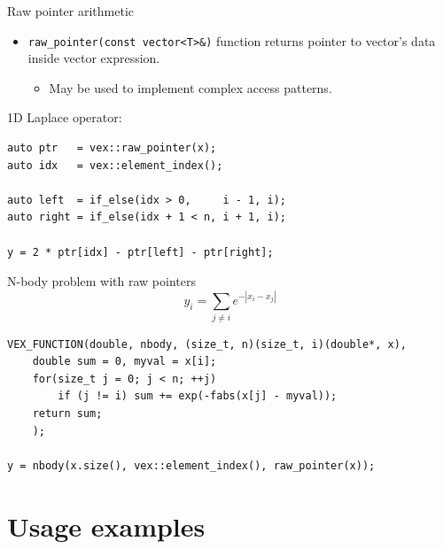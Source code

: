 \documentclass[@BEAMER_OPTIONS@]{beamer}
\newcommand{\code}[1]{\lstinline|#1|}
\begin{document}
\begin{frame}[fragile]{Raw pointer arithmetic}
    \begin{itemize}
        \item \code{raw_pointer(const vector<T>&)} function returns pointer to
            vector's data\\ inside vector expression.
            \begin{itemize}
                \item May be used to implement complex access patterns.
            \end{itemize}
    \end{itemize}
    \begin{exampleblock}{1D Laplace operator:}
        \begin{lstlisting}
auto ptr   = vex::raw_pointer(x);
auto idx   = vex::element_index();

auto left  = if_else(idx > 0,     i - 1, i);
auto right = if_else(idx + 1 < n, i + 1, i);

y = 2 * ptr[idx] - ptr[left] - ptr[right];
        \end{lstlisting}
    \end{exampleblock}
\end{frame}

\note{ }

\begin{frame}[fragile]{N-body problem with raw pointers}
    \begin{equation*}
        y_i = \sum_{j \neq i} e^{-|x_i - x_j|}
    \end{equation*}
    \begin{exampleblock}{}
        \begin{lstlisting}
VEX_FUNCTION(double, nbody, (size_t, n)(size_t, i)(double*, x),
    double sum = 0, myval = x[i];
    for(size_t j = 0; j < n; ++j)
        if (j != i) sum += exp(-fabs(x[j] - myval));
    return sum;
    );

y = nbody(x.size(), vex::element_index(), raw_pointer(x));
        \end{lstlisting}
    \end{exampleblock}
\end{frame}

\note{ }

\section{Usage examples}
\begin{frame}
    \sectionpage
\end{frame}
\end{document}
